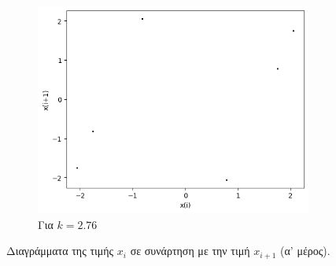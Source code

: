 \begin{figure}[ht]
\begin{subfigure}[b]{0.4\textwidth}
		\includegraphics[width=\textwidth]{LateX images/sine q=-0.3/g7}
		\caption{Για $k=2.76$}
		\label{f:k120}
	\end{subfigure}
	\hfill		
	\caption{Διαγράμματα της τιμής \(x_i\) σε συνάρτηση με την τιμή \(x_{i+1}\) (α' μέρος).}
	\label{f:k246}
\end{figure}
